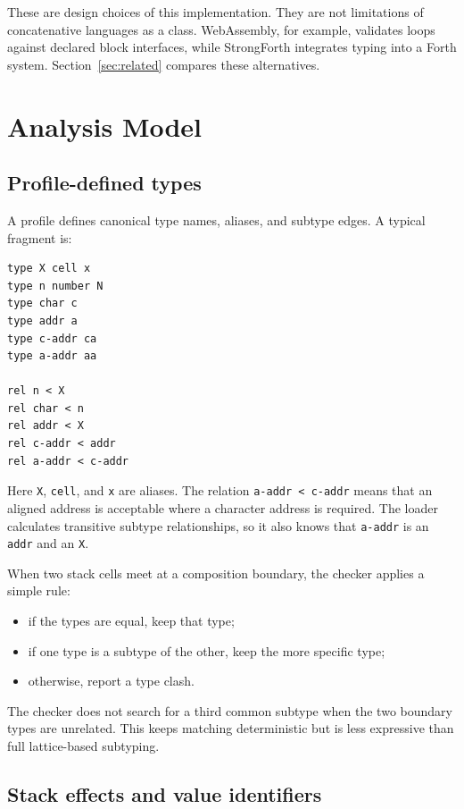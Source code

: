 \documentclass[11pt,a4paper]{article}
\begin{document}
These are design choices of this implementation.  They are not limitations of
concatenative languages as a class.  WebAssembly, for example, validates loops
against declared block interfaces, while StrongForth integrates typing into a
Forth system.  Section~\ref{sec:related} compares these alternatives.

\section{Analysis Model}
\label{sec:model}

\subsection{Profile-defined types}

A profile defines canonical type names, aliases, and subtype edges.  A typical
fragment is:

\begin{lstlisting}
type X cell x
type n number N
type char c
type addr a
type c-addr ca
type a-addr aa

rel n < X
rel char < n
rel addr < X
rel c-addr < addr
rel a-addr < c-addr
\end{lstlisting}

Here \texttt{X}, \texttt{cell}, and \texttt{x} are aliases.  The relation
\texttt{a-addr < c-addr} means that an aligned address is acceptable where a
character address is required.  The loader calculates transitive subtype
relationships, so it also knows that \texttt{a-addr} is an \texttt{addr} and
an \texttt{X}.

When two stack cells meet at a composition boundary, the checker applies a
simple rule:

\begin{itemize}
  \item if the types are equal, keep that type;
  \item if one type is a subtype of the other, keep the more specific type;
  \item otherwise, report a type clash.
\end{itemize}

The checker does not search for a third common subtype when the two boundary
types are unrelated.  This keeps matching deterministic but is less expressive
than full lattice-based subtyping.

\subsection{Stack effects and value identifiers}
\end{document}
